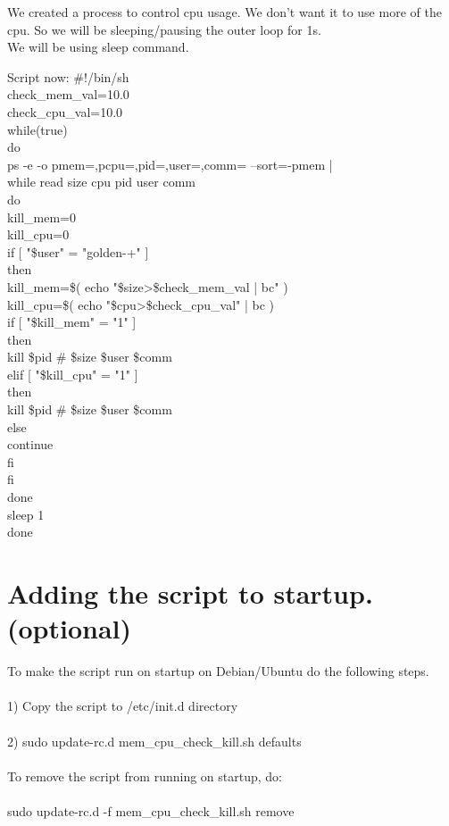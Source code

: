 \documentclass[12pt,a4paper]{article}
\begin{document}
We created a process to control cpu usage. We don't want it to use more of the cpu. So we will be sleeping/pausing the outer loop for 1s.\\We will be using sleep command.\\
\begin{flushleft}
Script now:
\newline
\#!/bin/sh\\
check\_mem\_val=10.0\\
check\_cpu\_val=10.0\\
while(true)\\
do\\
ps -e -o pmem=,pcpu=,pid=,user=,comm= --sort=-pmem |\\
  while read size cpu pid user comm\\
  do\\
kill\_mem=0\\
kill\_cpu=0\\
if [ "\$user" = "golden-+" ]\\
    then\\
kill\_mem=\$( echo "\$size>\$check\_mem\_val | bc" )\\
kill\_cpu=\$( echo "\$cpu>\$check\_cpu\_val" | bc )\\
 if [ "\$kill\_mem" = "1" ]\\
      then\\
        kill \$pid \# \$size \$user \$comm\\
      elif [ "\$kill\_cpu" = "1" ]\\
      then\\
        kill \$pid \# \$size \$user \$comm\\
      else\\
        continue\\
      fi\\
fi\\
  done\\
sleep 1\\
done\\
\end{flushleft}
\newpage
\section{Adding the script to startup.(optional)}

To make the script run on startup on Debian/Ubuntu do the following steps.\\\\1) Copy the script to /etc/init.d directory\\\\2) sudo update-rc.d mem\_cpu\_check\_kill.sh defaults\\\\
To remove the script from running on startup, do:\\\\
sudo update-rc.d -f mem\_cpu\_check\_kill.sh remove\\\\
\end{document}

